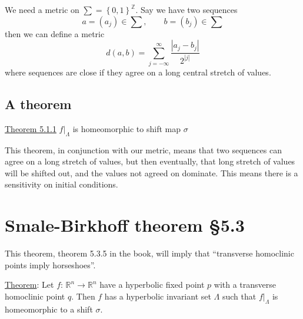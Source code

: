 \documentclass{article}
\begin{document}
We need a metric on $\sum = \left\{0,1\right\}^{\mathbb{Z}}$. Say we have two sequences 
\[
a=(a_j)\in\sum, \qquad b=(b_j)\in\sum
\]
then we can define a metric 
\[
d(a,b) = \sum_{j=-\infty}^{\infty}\frac{\left| a_j - b_j \right|}{2^{\left| j \right|}}
\]
where sequences are close if they agree on a long central stretch of values.

\subsection{A theorem}

\underline{Theorem 5.1.1} $f\big|_\Lambda$ is homeomorphic to shift map $\sigma$

This theorem, in conjunction with our metric, means that two sequences can agree on a long stretch of values, but then eventually, that long stretch of values will be shifted out, and the values not agreed on dominate. This means there is a sensitivity on initial conditions.

\section{Smale-Birkhoff theorem \S 5.3}

This theorem, theorem 5.3.5 in the book, will imply that ``transverse homoclinic points imply horseshoes''.

\underline{Theorem}: Let $f:\, \mathbb{R}^n\to \mathbb{R}^n$ have a hyperbolic fixed point $p$ with a transverse homoclinic point $q$. Then $f$ has a hyperbolic invariant set $\Lambda$ such that $f\big|_\Lambda$ is homeomorphic to a shift $\sigma$.
\end{document}
